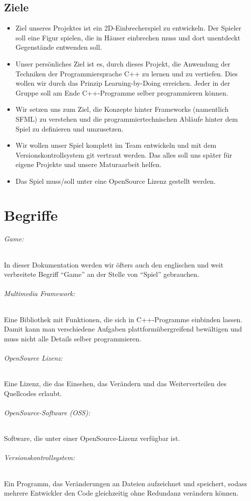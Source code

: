 \documentclass[11pt,a4paper]{scrbook}
\newcommand{\q}[1]{``#1''}
\begin{document}
\section{Ziele}
\begin{itemize}
\item 
Ziel unseres Projektes ist ein 2D-Einbrecherspiel zu entwickeln. Der Spieler soll eine Figur spielen, die in Häuser einbrechen muss und dort unentdeckt Gegenstände entwenden soll.
\item
Unser persönliches Ziel ist es, durch dieses Projekt, die Anwendung der Techniken der
Programmiersprache C++ zu lernen und zu vertiefen. Dies wollen wir durch
das Prinzip Learning-by-Doing erreichen. Jeder in der Gruppe soll am Ende
C++-Programme selber programmieren können.
\item
Wir setzen uns zum Ziel,
die Konzepte hinter Frameworks (namentlich SFML) zu verstehen und die
programmiertechnischen Abläufe hinter dem Spiel zu definieren und
umzusetzen.
\item
Wir wollen unser Spiel komplett im Team entwickeln und
mit dem Versionskontrollsystem git vertraut werden. Das alles soll uns später
für eigene Projekte und unsere Maturaarbeit helfen.
\item
Das Spiel muss/soll unter eine OpenSource Lizenz gestellt werden.
\end{itemize}



\chapter{Begriffe}
\subparagraph{Game:}
In dieser Dokumentation werden wir öfters auch den englischen und weit verbreitete Begriff \q{Game} an der Stelle von \q{Spiel} gebrauchen.

\subparagraph{Multimedia Framework:}
Eine Bibliothek mit Funktionen, die sich in C++-Programme einbinden lassen. Damit kann man verschiedene Aufgaben plattformübergreifend bewältigen und muss nicht alle Details selber programmieren.

\subparagraph{OpenSource Lizenz:}

Eine Lizenz, die das Einsehen, das Verändern und das Weiterverteilen des Quellcodes erlaubt.

\subparagraph{OpenSource-Software (OSS):}
Software, die unter einer OpenSource-Lizenz verfügbar ist.

\subparagraph{Versionskontrollsystem:}
Ein Programm, das Veränderungen an Dateien aufzeichnet und speichert, sodass mehrere Entwickler den Code gleichzeitig ohne Redundanz verändern können.
\end{document}
